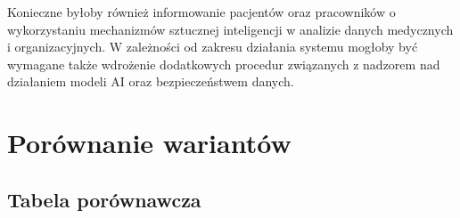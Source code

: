 Konieczne byłoby również informowanie pacjentów oraz pracowników o wykorzystaniu mechanizmów sztucznej inteligencji w analizie danych medycznych i organizacyjnych. W zależności od zakresu działania systemu mogłoby być wymagane także wdrożenie dodatkowych procedur związanych z nadzorem nad działaniem modeli AI oraz bezpieczeństwem danych.

\section{Porównanie wariantów}

\subsection{Tabela porównawcza}

\renewcommand{\arraystretch}{1.3}

